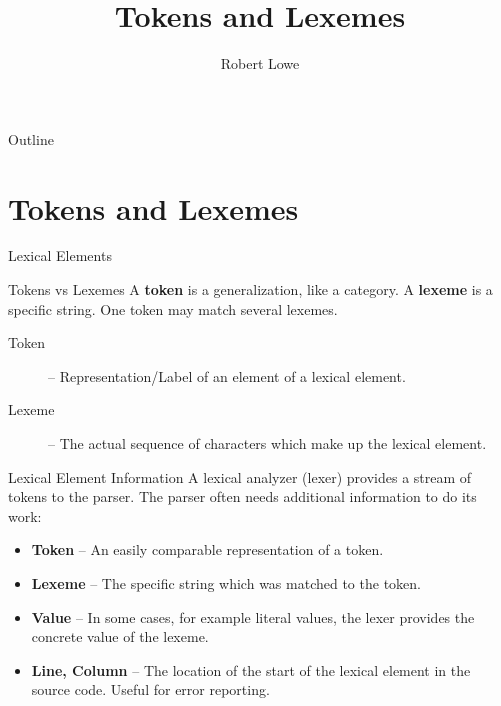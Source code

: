 \documentclass[handout]{beamer}
\title{Tokens and Lexemes}
\author{Robert Lowe}
\institute[Southeast Missouri State University] %
{
  Department of Computer Science\\
  Southeast Missouri State University
}
\date[]{}
\begin{document}
\begin{frame}
  \titlepage
\end{frame}

\begin{frame}{Outline}
  \tableofcontents
\end{frame}





\section{Tokens and Lexemes}
\begin{frame}{Lexical Elements}
    \begin{block}{Tokens vs Lexemes}
        A {\bf token} is a generalization, like a category. A {\bf lexeme} is a specific string.
        One token may match several lexemes.
    \end{block}
    \begin{description}
        \item[Token] -- Representation/Label of an element of a lexical element.
        \item[Lexeme] -- The actual sequence of characters which make up the lexical element.
    \end{description}
\end{frame}

\begin{frame}{Lexical Element Information}
    A lexical analyzer (lexer) provides a stream of tokens to the parser. The parser often
    needs additional information to do its work:
    \begin{itemize}
        \item {\bf Token} -- An easily comparable representation of a token.
        \item {\bf Lexeme} -- The specific string which was matched to the token.
        \item {\bf Value} -- In some cases, for example literal values, the lexer
            provides the concrete value of the lexeme. 
        \item {\bf Line, Column} -- The location of the start of the lexical element in the 
            source code. Useful for error reporting.
    \end{itemize}
\end{frame}
\end{document}
